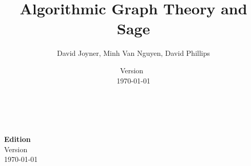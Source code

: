\documentclass[a4paper,twoside,12pt]{book}
\begin{document}

\title{\Huge\bf Algorithmic Graph Theory and Sage}
\author{\Large David Joyner, Minh Van Nguyen, David Phillips}
\date{%
  Version~\documentEdition \\
  \today
}
\maketitle

{\thispagestyle{empty}
   \\\\
  \textbf{Edition} \\
  Version~\documentEdition \\
  \today
}

\frontmatter
\setcounter{tocdepth}{1}
\tableofcontents
\let\cleardoublepage\clearpage

\let\cleardoublepage\clearpage

\mainmatter












\appendix
\cleardoublepage

\cleardoublepage


\backmatter
\cleardoublepage
{}


\cleardoublepage
{}
\printindex
\end{document}
